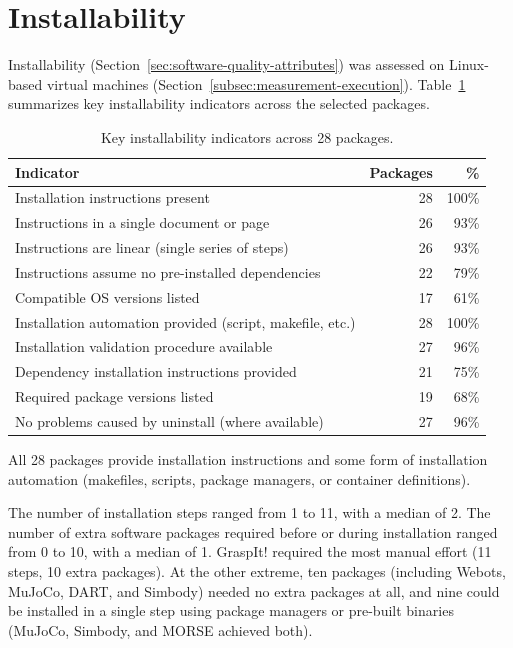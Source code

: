 \section{Installability}
\label{sec:installability-results}

Installability (Section~\ref{sec:software-quality-attributes}) was assessed on Linux-based virtual machines (Section~\ref{subsec:measurement-execution}). Table~\ref{tab:installability} summarizes key installability indicators across the selected packages.

\begin{table}[H]
\centering
\caption{Key installability indicators across 28 packages.}
\label{tab:installability}
\begin{tabular}{@{}lrr@{}}
\toprule
\textbf{Indicator} & \textbf{Packages} & \textbf{\%} \\
\midrule
Installation instructions present & 28 & 100\% \\
Instructions in a single document or page & 26 & 93\% \\
Instructions are linear (single series of steps) & 26 & 93\% \\
Instructions assume no pre-installed dependencies & 22 & 79\% \\
Compatible OS versions listed & 17 & 61\% \\
Installation automation provided (script, makefile, etc.) & 28 & 100\% \\
Installation validation procedure available & 27 & 96\% \\
Dependency installation instructions provided & 21 & 75\% \\
Required package versions listed & 19 & 68\% \\
No problems caused by uninstall (where available) & 27 & 96\% \\
\bottomrule
\end{tabular}
\end{table}

All 28 packages provide installation instructions and some form of installation automation (makefiles, scripts, package managers, or container definitions).

The number of installation steps ranged from 1 to 11, with a median of 2. The number of extra software packages required before or during installation ranged from 0 to 10, with a median of 1. GraspIt! required the most manual effort (11 steps, 10 extra packages). At the other extreme, ten packages (including Webots, MuJoCo, DART, and Simbody) needed no extra packages at all, and nine could be installed in a single step using package managers or pre-built binaries (MuJoCo, Simbody, and MORSE achieved both).

